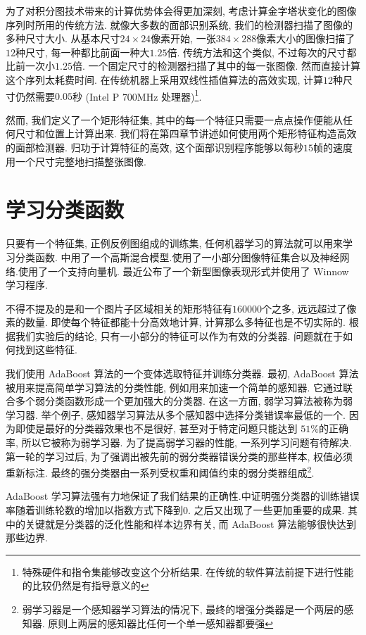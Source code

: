 \documentclass[a4paper,utf8,11pt, onecolumn]{ctexart}
\newcommand{\RN}[1]{%
  \textup{\uppercase\expandafter{\romannumeral#1}}%
}
\begin{document}
为了对积分图技术带来的计算优势体会得更加深刻, 考虑计算金字塔状变化的图像序列时所用的传统方法. 就像大多数的面部识别系统, 我们的检测器扫描了图像的多种尺寸大小. 从基本尺寸$24\times24$像素开始, 一张$384\times288$像素大小的图像扫描了$12$种尺寸, 每一种都比前面一种大$1.25$倍.
传统方法和这个类似, 不过每次的尺寸都比前一次小$1.25$倍. 一个固定尺寸的检测器扫描了其中的每一张图像. 然而直接计算这个序列太耗费时间. 在传统机器上采用双线性插值算法的高效实现, 计算$12$种尺寸仍然需要$0.05$秒 (Intel P\RN{3} 700MHz 处理器)\footnote{特殊硬件和指令集能够改变这个分析结果. 在传统的软件算法前提下进行性能的比较仍然是有指导意义的}.

然而, 我们定义了一个矩形特征集, 其中的每一个特征只需要一点点操作便能从任何尺寸和位置上计算出来. 我们将在第四章节讲述如何使用两个矩形特征构造高效的面部检测器. 归功于计算特征的高效, 这个面部识别程序能够以每秒$15$帧的速度用一个尺寸完整地扫描整张图像.

\section{学习分类函数}\label{sec:learning}
只要有一个特征集, 正例反例图组成的训练集, 任何机器学习的算法就可以用来学习分类函数. \citet{sung1998example}中用了一个高斯混合模型.\citet{rowley1998neural}使用了一小部分图像特征集合以及神经网络.\citet{osuna1997training-2}使用了一个支持向量机. 最近\citet{yang2000snow}公布了一个新型图像表现形式并使用了 Winnow 学习程序.

不得不提及的是和一个图片子区域相关的矩形特征有$160000$个之多, 远远超过了像素的数量. 即使每个特征都能十分高效地计算, 计算那么多特征也是不切实际的. 根据我们实验后的结论, 只有一小部分的特征可以作为有效的分类器. 问题就在于如何找到这些特征.

我们使用 AdaBoost 算法的一个变体选取特征并训练分类器\citep{freund1995desicion}. 最初, AdaBoost 算法被用来提高简单学习算法的分类性能, 例如用来加速一个简单的感知器. 它通过联合多个弱分类函数形成一个更加强大的分类器. 在这一方面, 弱学习算法被称为弱学习器.
举个例子, 感知器学习算法从多个感知器中选择分类错误率最低的一个. 因为即使是最好的分类器效果也不是很好, 甚至对于特定问题只能达到 $51\%$的正确率, 所以它被称为弱学习器.
为了提高弱学习器的性能, 一系列学习问题有待解决. 第一轮的学习过后, 为了强调出被先前的弱分类器错误分类的那些样本, 权值必须重新标注. 最终的强分类器由一系列受权重和阈值约束的弱分类器组成\footnote{弱学习器是一个感知器学习算法的情况下, 最终的增强分类器是一个两层的感知器. 原则上两层的感知器比任何一个单一感知器都要强}.

AdaBoost 学习算法强有力地保证了我们结果的正确性.\citet{schapire1997boosting}中证明强分类器的训练错误率随着训练轮数的增加以指数方式下降到$0$. 之后又出现了一些更加重要的成果. 其中的关键就是分类器的泛化性能和样本边界有关, 而 AdaBoost 算法能够很快达到那些边界.
\end{document}
